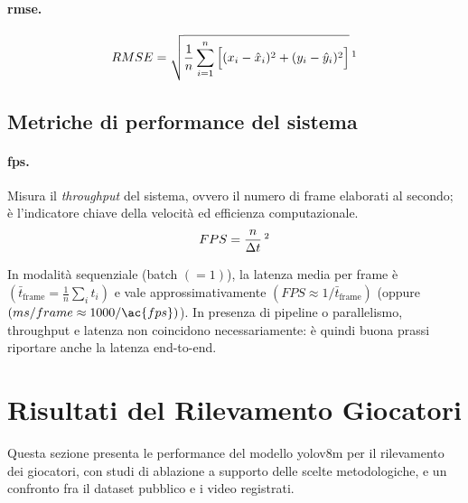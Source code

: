 \documentclass[12pt,a4paper,openright,twoside]{book}
\begin{document}
\paragraph{\ac{rmse}.}
\begin{equation}
  \label{eq:rmse_2d}
  {RMSE} = \sqrt{\frac{1}{n}\sum_{i=1}^{n}\Big[(x_i - \hat{x}_i)^2 + (y_i - \hat{y}_i)^2\Big]}\,\footnotemark
\end{equation}

\subsection{Metriche di performance del sistema}
\paragraph{\acf{fps}.} Misura il \emph{throughput} del sistema, ovvero il numero di frame elaborati al secondo; 
è l'indicatore chiave della velocità ed efficienza computazionale.
\begin{equation}
  \label{eq:fps}
  {FPS} = \frac{n}{\Delta t}\,\footnotemark
\end{equation}

\noindent In modalità sequenziale (batch $(=1)$), la latenza media per frame è $(\bar{t}_{\text{frame}}=\tfrac{1}{n}\sum_i t_i)$ 
e vale approssimativamente $({FPS}\approx 1/\bar{t}_{\text{frame}})$ (oppure $({ms/frame}\approx 1000/\ac{fps})$). 
In presenza di pipeline o parallelismo, throughput e latenza non coincidono necessariamente: è quindi buona prassi 
riportare anche la latenza end-to-end.

\section{Risultati del Rilevamento Giocatori}
\label{sec:risultati-rilevamento-giocatori}
Questa sezione presenta le performance del modello \ac{yolo}v8m per il rilevamento dei giocatori, 
con studi di ablazione a supporto delle scelte metodologiche, e un confronto fra il dataset 
pubblico e i video registrati.
\end{document}
